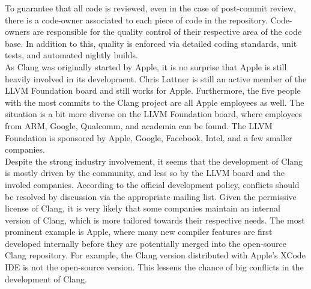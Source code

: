 To guarantee that all code is reviewed, even in the case of post-commit review, there is a code-owner associated to each piece of code in the repository. Code-owners are responsible for the quality control of their respective area of the code base. In addition to this, quality is enforced via detailed coding standards, unit tests, and automated nightly builds. \\

As Clang was originally started by Apple, it is no surprise that Apple is still heavily involved in its development. Chris Lattner is still an active member of the LLVM Foundation board and still works for Apple.\cite{lattner} Furthermore, the five people with the most commits to the Clang project are all Apple employees as well.\cite{clang-commits} The situation is a bit more diverse on the LLVM Foundation board, where employees from ARM, Google, Qualcomm, and academia can be found.\cite{llvm-board} The LLVM Foundation is sponsored by Apple, Google, Facebook, Intel, and a few smaller companies.\cite{llvm-sponsors} \\

Despite the strong industry involvement, it seems that the development of Clang is mostly driven by the community, and less so by the LLVM board and the involed companies. According to the official development policy, conflicts should be resolved by discussion via the appropriate mailing list.\cite{clang-policy} Given the permissive license of Clang, it is very likely that some companies maintain an internal version of Clang, which is more tailored towards their respective needs. The most prominent example is Apple, where many new compiler features are first developed internally before they are potentially merged into the open-source Clang repository. For example, the Clang version distributed with Apple's XCode IDE is not the open-source version. \cite{Clang in XCODE}  This lessens the chance of big conflicts in the development of Clang.


